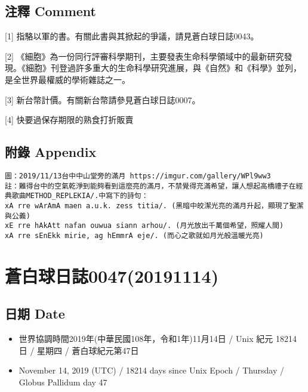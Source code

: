 \documentclass[a5paper, 12pt
]{book}
\providecommand{\tightlist}{%
  \setlength{\itemsep}{0pt}\setlength{\parskip}{0pt}}
\begin{document}
\hypertarget{ux6ce8ux91cb-comment-39}{%
\subsection{注釋 Comment}\label{ux6ce8ux91cb-comment-39}}

{[}1{]} 指駱以軍的書。有關此書與其掀起的爭議，請見蒼白球日誌0043。

{[}2{]}
《細胞》為一份同行評審科學期刊，主要發表生命科學領域中的最新研究發現。《細胞》刊登過許多重大的生命科學研究進展，與《自然》和《科學》並列，是全世界最權威的學術雜誌之一。

{[}3{]} 新台幣計價。有關新台幣請參見蒼白球日誌0007。

{[}4{]} 快要過保存期限的熟食打折販賣

\hypertarget{ux9644ux9304-appendix-38}{%
\subsection{附錄 Appendix}\label{ux9644ux9304-appendix-38}}

\begin{verbatim}
圖：2019/11/13台中中山堂旁的滿月 https://imgur.com/gallery/WPl9ww3
註：難得台中的空氣乾淨到能夠看到這麼亮的滿月，不禁覺得充滿希望，讓人想起高橋禮子在經典歌曲METHOD_REPLEKIA/.中寫下的詩句：
xA rre wArAmA maen a.u.k. zess titia/. (黑暗中皎潔光亮的滿月升起，顯現了聖潔與公義)
xE rre hAkAtt nafan ouwua siann arhou/. (月光放出千萬個希望，照耀人間)
xA rre sEnEkk mirie, ag hEmmrA eje/. (而心之歌就如月光般溫暖光亮)
\end{verbatim}

\hypertarget{ux84bcux767dux7403ux65e5ux8a8c004720191114}{%
\section{蒼白球日誌0047(20191114)}\label{ux84bcux767dux7403ux65e5ux8a8c004720191114}}

\hypertarget{ux65e5ux671f-date-46}{%
\subsection{日期 Date}\label{ux65e5ux671f-date-46}}

\begin{itemize}
\tightlist
\item
  世界協調時間2019年(中華民國108年，令和1年)11月14日 / Unix 紀元 18214
  日 / 星期四 / 蒼白球紀元第47日
\item
  November 14, 2019 (UTC) / 18214 days since Unix Epoch / Thursday /
  Globus Pallidum day 47
\end{itemize}
\end{document}
